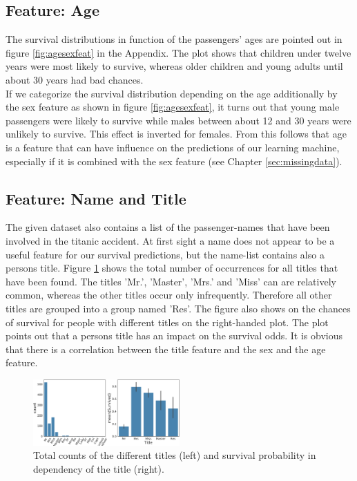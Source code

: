 \subsection*{Feature: Age}
\label{sec:age}
The survival distributions in function of the passengers' ages are pointed out in figure \ref{fig:agesexfeat} in the Appendix. The plot shows that children under twelve years were most likely to survive, whereas older children and young adults until about 30 years had bad chances.\\ 
If we categorize the survival distribution depending on the age additionally by the sex feature as shown in figure \ref{fig:agesexfeat}, it turns out that young male passengers were likely to survive while males between about 12 and 30 years were unlikely to survive. This effect is inverted for females. From this follows that age is a feature that can have influence on the predictions of our learning machine, especially if it is combined with the sex feature (see Chapter \ref{sec:missingdata}).


 
 \subsection*{Feature: Name and Title}
The given dataset also contains a list of the passenger-names that have been involved in the titanic accident. At first sight a name does not appear to be a useful feature for our survival predictions, but the name-list contains also a persons title. Figure \ref{fig:title} shows the total number of occurrences for all titles that have been found. The titles 'Mr.', 'Master', 'Mrs.' and 'Miss' can are relatively common, whereas the other titles occur only infrequently. Therefore all other titles are grouped into a group named 'Res'. The figure also shows on the chances of survival for people with different titles on the right-handed plot. The plot points out that a persons title has an impact on the survival odds. It is obvious that there is a correlation between the title feature and the sex and the age feature.

 \begin{figure}
 \centering
     \includegraphics[width=0.5\textwidth]{media_saved/title}
     \caption{Total counts of the different titles (left) and survival probability in dependency of the title (right).}
     \label{fig:title}
 \end{figure}
 

